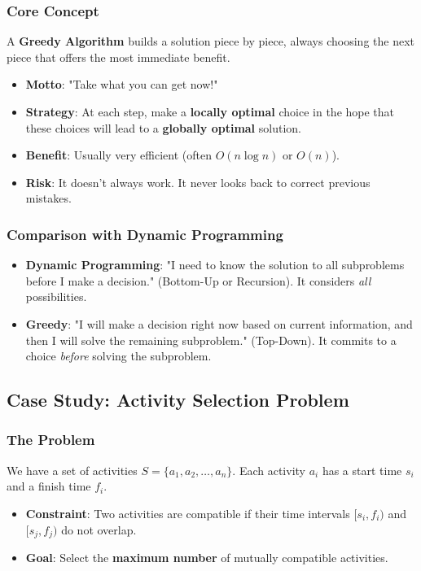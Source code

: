 \documentclass[12pt]{article}
\theoremstyle{blueplain}
\theoremstyle{bluedef}
\theoremstyle{blueremark}
\begin{document}
\subsubsection{Core Concept}
A \textbf{Greedy Algorithm} builds a solution piece by piece, always choosing the next piece that offers the most immediate benefit.
\begin{itemize}
    \item \textbf{Motto}: "Take what you can get now!"
    \item \textbf{Strategy}: At each step, make a \textbf{locally optimal} choice in the hope that these choices will lead to a \textbf{globally optimal} solution.
    \item \textbf{Benefit}: Usually very efficient (often $O(n \log n)$ or $O(n)$).
    \item \textbf{Risk}: It doesn't always work. It never looks back to correct previous mistakes.
\end{itemize}

\subsubsection{Comparison with Dynamic Programming}
\begin{itemize}
    \item \textbf{Dynamic Programming}: "I need to know the solution to all subproblems before I make a decision." (Bottom-Up or Recursion). It considers \textit{all} possibilities.
    \item \textbf{Greedy}: "I will make a decision right now based on current information, and then I will solve the remaining subproblem." (Top-Down). It commits to a choice \textit{before} solving the subproblem.
\end{itemize}

\subsection{Case Study: Activity Selection Problem}

\subsubsection{The Problem}
We have a set of activities $S = \{a_1, a_2, \dots, a_n\}$. Each activity $a_i$ has a start time $s_i$ and a finish time $f_i$.
\begin{itemize}
    \item \textbf{Constraint}: Two activities are compatible if their time intervals $[s_i, f_i)$ and $[s_j, f_j)$ do not overlap.
    \item \textbf{Goal}: Select the \textbf{maximum number} of mutually compatible activities.
\end{itemize}
\end{document}
